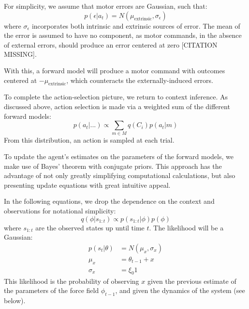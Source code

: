 \documentclass[a4paper,doc,floatsintext,natbib]{apa6}
\begin{document}
For simplicity, we assume that motor errors are Gaussian, such that:
\begin{equation}
p(\epsilon | a_t) = N(\mu_{\text{extrinsic}}, \sigma_\epsilon)
\end{equation}
where $\sigma_\epsilon$ incorporates both intrinsic and extrinsic sources of
error. The mean of the error is assumed to have no component, as motor
commands, in the absence of external errors, should produce an error centered
at zero [CITATION MISSING].

With this, a forward model will produce a motor command with outcomes centered
at $-\mu_{\text{extrinsic}}$, which counteracts the externally-induced errors.

To complete the action-selection picture, we return to context inference. As
discussed above, action selection is made via a weighted sum of the different
forward models:
\begin{equation}
p(a_t | ...) \propto \displaystyle \sum_{m \in M} q(C_i)p(a_t | m)
\end{equation}
From this distribution, an action is sampled at each trial.

To update the agent's estimates on the parameters of the forward models, we
make use of Bayes' theorem with conjugate priors. This approach has the
advantage of not only greatly simplifying computational calculations, but also
presenting update equations with great intuitive appeal.

In the following equations, we drop the dependence on the context and
observations for notational simplicity:
\begin{equation}
q(\phi | s_{1:t}) \propto p(s_{1:t} | \phi)p(\phi)
\end{equation}
where $s_{1:t}$ are the observed states up until time $t$. The likelihood will
be a Gaussian:
\begin{align}
  p(s_t | \theta) &= N(\mu_x, \sigma_x)  \\
  \mu_x &= \theta_{t-1} + x \\
  \sigma_x &= \xi_0 1
\end{align}
This likelihood is the probability of observing $x$ given the previous estimate
of the parameters of the force field $\phi_{t-1}$, and given the dynamics of
the system (see below).
\end{document}
